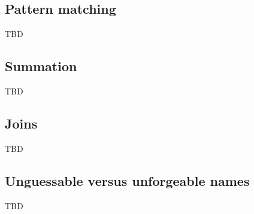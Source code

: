 \subsection{Pattern matching}
TBD
\subsection{Summation}
TBD
\subsection{Joins}
TBD
\subsection{Unguessable versus unforgeable names}
TBD
